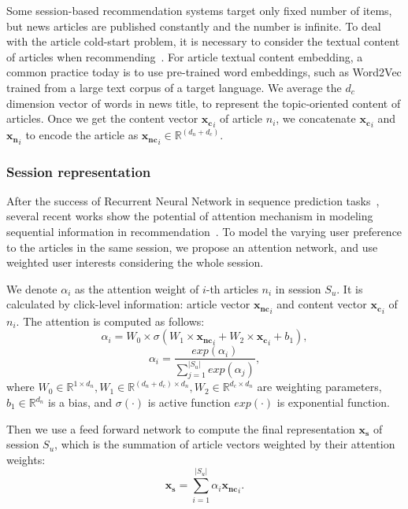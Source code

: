 Some session-based recommendation systems target only fixed number of items, 
but news articles are published constantly and the number is infinite. 
To deal with the article cold-start problem, it is necessary to consider the 
textual content of articles when recommending~\cite{sottocornola2018session}. 
For article textual content embedding, a common practice today is to use 
pre-trained word embeddings, such as Word2Vec trained from a large text corpus 
of a target language. We average the $d_c$ dimension vector of words in news title, 
to represent the topic-oriented content of articles. Once we get the 
content vector $\mathbf{x_c}_i$ of article $n_i$, 
we concatenate $\mathbf{x_c}_i$ and $\mathbf{x_n}_i$ to encode 
the article as $\mathbf{x_{nc}}_i \in \mathbb{R}^{(d_n+d_c)}$. 

\subsubsection{Session representation}
\label{sec:session}

After the success of Recurrent Neural Network in sequence prediction 
tasks~\cite{hidasi2015session}, 
several recent works show the potential of attention mechanism in 
modeling sequential information in 
recommendation~\cite{kang_self-attentive_2018,liu2018stamp,xu2019time}. 
To model the varying user preference to the articles in the same session,  
we propose an attention network, and use weighted user interests considering the whole session.

We denote $\alpha_i$ as the attention weight of $i$-th articles $n_i$ in session $S_u$. It is calculated by click-level information: 
article vector $\mathbf{x_{nc}}_i$ and content vector $\mathbf{x_{c}}_i$ of $n_i$. 
The attention is computed as follows:
\begin{equation}
    \alpha_i = W_0 \times \sigma (W_1 \times \mathbf{x_{nc}}_i + W_2 \times \mathbf{x_c}_i + b_1),
\end{equation}
\begin{equation}
    \alpha_i = \frac{exp(\alpha_i)}{\sum_{j=1}^{|S_u|}exp(\alpha_j)},
\end{equation}
where $W_0\in \mathbb{R}^{1 \times d_n}, W_1 \in \mathbb{R}^{(d_n+d_c)\times d_n}, W_2 \in \mathbb{R}^{d_c\times d_n}$ are weighting parameters, $b_1\in \mathbb{R}^{d_n}$ is a bias, and $\sigma(\cdot)$ is active function $exp(\cdot)$ is exponential function.

Then we use a feed forward network to compute the final representation $\mathbf{x_s}$ of session $S_u$, which is the summation of article vectors weighted by their attention weights:
\begin{equation}
    \label{eq:final_repre}
    \mathbf{x_s} = \sum_{i=1}^{|S_u|} \alpha_i \mathbf{x_{nc}}_i.
\end{equation}

